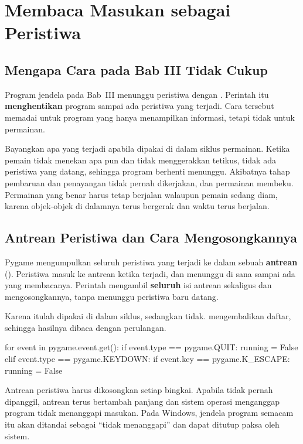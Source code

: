 \section{Membaca Masukan sebagai Peristiwa}
\label{sec:membaca-masukan}

\subsection{Mengapa Cara pada Bab III Tidak Cukup}

Program jendela pada Bab~III menunggu peristiwa dengan
. Perintah itu \textbf{menghentikan} program sampai
ada peristiwa yang terjadi. Cara tersebut memadai untuk program yang hanya
menampilkan informasi, tetapi tidak untuk permainan.

Bayangkan apa yang terjadi apabila  dipakai di dalam
siklus permainan. Ketika pemain tidak menekan apa pun dan tidak menggerakkan
tetikus, tidak ada peristiwa yang datang, sehingga program berhenti menunggu.
Akibatnya tahap pembaruan dan penayangan tidak pernah dikerjakan, dan
permainan membeku. Permainan yang benar harus tetap berjalan walaupun pemain
sedang diam, karena objek-objek di dalamnya terus bergerak dan waktu terus
berjalan.

\subsection{Antrean Peristiwa dan Cara Mengosongkannya}

Pygame mengumpulkan seluruh peristiwa yang terjadi ke dalam sebuah
\textbf{antrean} (). Peristiwa masuk ke antrean ketika terjadi,
dan menunggu di sana sampai ada yang membacanya. Perintah
 mengambil \textbf{seluruh} isi antrean sekaligus dan
mengosongkannya, tanpa menunggu peristiwa baru datang.

Karena itulah  dipakai di dalam siklus, sedangkan
 tidak.  mengembalikan
daftar, sehingga hasilnya dibaca dengan perulangan.

\begin{kodekeluaran}
for event in pygame.event.get():
    if event.type == pygame.QUIT:
        running = False
    elif event.type == pygame.KEYDOWN:
        if event.key == pygame.K_ESCAPE:
            running = False
\end{kodekeluaran}

\begin{peringatanbox}
Antrean peristiwa harus dikosongkan setiap bingkai. Apabila
 tidak pernah dipanggil, antrean terus bertambah
panjang dan sistem operasi menganggap program tidak menanggapi masukan. Pada
Windows, jendela program semacam itu akan ditandai sebagai ``tidak
menanggapi'' dan dapat ditutup paksa oleh sistem.
\end{peringatanbox}

